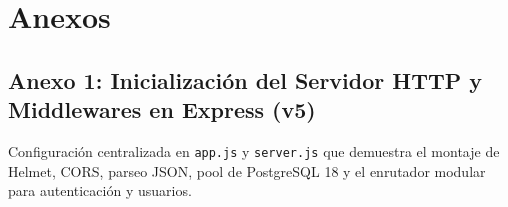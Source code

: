 \documentclass[11pt,a4paper]{article}
\begin{document}
\vspace{0.4cm}

\section{Anexos}
\subsection*{Anexo 1: Inicialización del Servidor HTTP y Middlewares en Express (v5)}
Configuración centralizada en \texttt{app.js} y \texttt{server.js} que demuestra el montaje de Helmet, CORS, parseo JSON, pool de PostgreSQL 18 y el enrutador modular para autenticación y usuarios.
\end{document}
